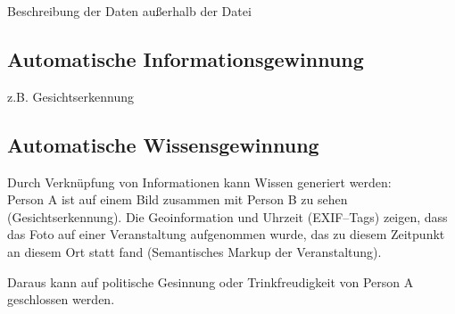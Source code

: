 Beschreibung der Daten außerhalb der Datei

\subsection{Automatische Informationsgewinnung}

z.B. Gesichtserkennung

\subsection{Automatische Wissensgewinnung}

Durch Verknüpfung von Informationen kann Wissen generiert werden:\\
Person A ist auf einem Bild zusammen mit Person B zu sehen (Gesichtserkennung). Die Geoinformation und Uhrzeit (EXIF--Tags) zeigen, dass das Foto auf einer Veranstaltung aufgenommen wurde, das zu diesem Zeitpunkt an diesem Ort statt fand (Semantisches Markup der Veranstaltung).

Daraus kann auf politische Gesinnung oder Trinkfreudigkeit von Person A geschlossen werden.